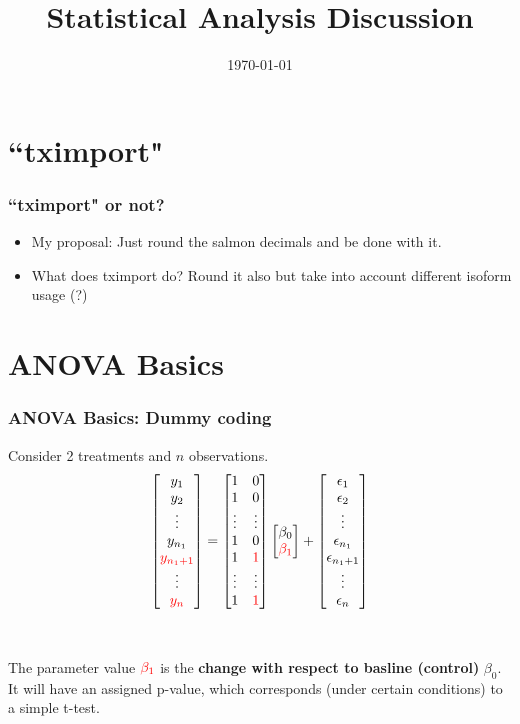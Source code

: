 \documentclass{beamer}
\title{Statistical Analysis Discussion}
\date{\today}
\begin{document}
\begin{frame}
	\titlepage
\end{frame}


\section{``tximport"}
\begin{frame}
    \frametitle{``tximport" or not?}
	\begin{itemize}
        \item My proposal: Just round the salmon decimals and be done with it.
        \item What does tximport do? Round it also but take into account different isoform usage (?)
    \end{itemize}
\end{frame}

\section{ANOVA Basics}
\begin{frame}
\frametitle{ANOVA Basics: Dummy coding}

Consider 2 treatments and $n$ observations.
\[
\begin{bmatrix}
y_{1} \\
y_{2} \\
\vdots \\
y_{n_1} \\
\textcolor{red}{y_{n_1+1}} \\
\vdots \\
\textcolor{red}{y_{n}}
\end{bmatrix}
=
\begin{bmatrix}
1 & 0 \\
1 & 0 \\
\vdots & \vdots \\
1 & 0 \\
1 & \textcolor{red}{1} \\
\vdots & \vdots \\
1 & \textcolor{red}{1}
\end{bmatrix}
\begin{bmatrix}
\beta_0 \\
\textcolor{red}{\beta_1}
\end{bmatrix}
+
\begin{bmatrix}
\epsilon_{1} \\
\epsilon_{2} \\
\vdots \\
\epsilon_{n_1} \\
\epsilon_{n_1+1} \\
\vdots \\
\epsilon_{n}
\end{bmatrix}
\]
\\~\\
\footnotesize
The parameter value $\textcolor{red}{\beta_1}$ is the \textbf{change with respect to basline (control)} $\beta_0$. It will have an assigned p-value, which corresponds (under certain conditions) to a simple t-test.
   
\end{frame}
\end{document}
